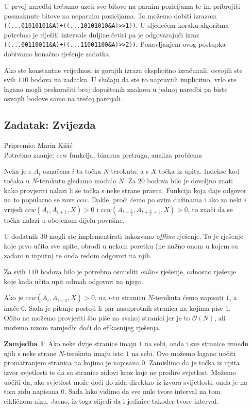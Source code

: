 \documentclass[a4paper]{article}
\begin{document}
U prvoj naredbi trebamo uzeti sve bitove na parnim pozicijama te im pribrojiti
posmaknute bitove na neparnim pozicijama. To možemo dobiti izrazom
\verb|((...01010101&A)+((...10101010&A)>>1))|. U sljedećem koraku algoritma
potrebno je riješiti intervale duljine četiri pa je odgovarajuči izraz
\verb|((...00110011&A)+((...11001100&A)>>2))|. Ponavljanjem ovog postupka
dobivamo konačno rješenje zadatka.

Ako ste konstantne vrijednosi iz gornjih izraza eksplicitno izračunali, osvojili
ste svih $110$ bodova na zadatku. U slučaju da ste to napraviili implicitno,
vrlo ste lagano mogli prekoračiti broj dopuštenih znakova u jednoj naredbi pa
biste osvojili bodove samo na trećoj parcijali.

\subsection*{Zadatak: Zvijezda}
\textsf{Pripremio: Marin Kišić}\\
\textsf{Potrebno znanje: ccw funkcija, binarna pretraga, analiza problema}

Neka je s $A_i$ označena $i$-ta točka $N$-terokuta, a s $X$ točka iz upita.
Indekse kod točaka u $N$-terokutu gledamo modulo $N$.  Za $20$ bodova bilo je
dovoljno znati kako provjeriti nalazi li se točka s neke strane pravca.
Funkcija koja daje odgovor na to popularno se zove $ccw$. Dakle, proći ćemo po
svim dužinama i ako za neki $i$ vrijedi $ccw(A_i, A_{i+1}, X) > 0$ i
$ccw(A_{i+\frac{n}{2}}, A_{i+\frac{n}{2}+1}, X) > 0$, to znači da se točka
nalazi u obojenom dijelu površine.

U dodatnih $30$ mogli ste implementirati takozvano \textit{offline} rješenje.
To je rješenje koje prvo učita sve upite, obradi u nekom poretku (ne nužno onom
u kojem su zadani u inputu) te onda redom odgovori na njih.

Za svih $110$ bodova bilo je potrebno osmisliti \textit{online} rješenje,
odnosno rješenje koje kada učita upit odmah odgovori na njega.

Ako je $ccw(A_{i}, A_{i+1}, X) > 0$, na $i$-tu stranicu $N$-terokuta ćemo
napisati $1$, a inače $0$. Sada je pitanje postoji li par nasuprotnih stranica
na kojima pise $1$.  Očito ne možemo provjeriti što piše na svakoj stranici jer
je to $\mathcal{O}(N)$, ali možemo nizom zamjedbi doći do efikasnijeg rješenja.

\textbf{Zamjedba 1}: Ako neke dvije stranice imaju $1$ na sebi, onda i sve
stranice između njih s neke strane $N$-terokuta imaju isto $1$ na sebi. Ovo
možemo lagano uočiti promatranjem stranica na kojima je napisana $0$.
Zamislimo da je točka iz upita izvor svjetlosti te da su stranice zidovi kroz
koje ne prodire svjetlost.  Možemo uočiti da, ako svjetlost može doći do zida
direktno iz izvora svijetlosti, onda je na tom zidu napisana $0$. Sada lako
vidimo da sve nule tvore interval na tom cikličnom nizu. Jasno, iz toga slijedi
da i jedinice također tvore interval.
\end{document}
